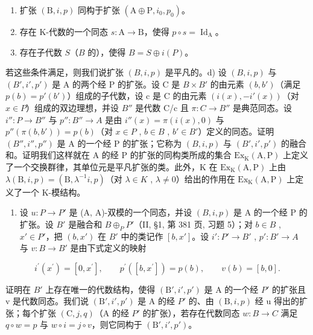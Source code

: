 \begin{enumerate}
\def\labelenumi{(\roman{enumi})}
\item
  扩张 \((\mathrm{B},i,p)\) 同构于扩张 \((\mathrm{A}\oplus \mathrm{P},i_0,p_0)\)。
\item
  存在 K-代数的一个同态 \(s: \mathrm{A} \to \mathrm{B}\)，使得 \(p \circ s = \operatorname{Id}_{\mathrm{A}}\)。
\item
  存在子代数 \(S\)（\(B\) 的），使得 \(B = S \oplus i(P)\)。
\end{enumerate}

若这些条件满足，则我们说扩张 \((B,i,p)\) 是平凡的。d) 设 \((B,i,p)\) 与 \((B',i',p')\) 是 A 的两个经 P 的扩张。设 C 是 \(B \times B'\) 的由元素 \((b,b')\)（满足 \(p(b) = p'(b')\)）组成的子代数，设 c 是 C 的由元素 \((i(x), -i'(x))\)（对 \(x \in P\)）组成的双边理想，并设 \(B''\) 是代数 C/c 且 \(\pi : C \to B''\) 是典范同态。设 \(i'' : P \to B''\) 与 \(p'' : B'' \to A\) 是由 \(i''(x) = \pi(i(x),0)\) 与 \(p''(\pi(b,b')) = p(b)\)（对 \(x \in P\) , \(b \in B\) , \(b' \in B'\)）定义的同态。证明 \((B'', i'', p'')\) 是 A 的一个经 P 的扩张；它称为 \((B,i,p)\) 与 \((B',i',p')\) 的融合和。证明我们这样就在 A 的经 P 的扩张的同构类所成的集合 \(\mathrm{Ex}_{\mathrm{K}}(\mathrm{A},\mathrm{P})\) 上定义了一个交换群律，其单位元是平凡扩张的类。此外，K 在 \(\mathrm{Ex}_{\mathrm{K}}(\mathrm{A},\mathrm{P})\) 上由 \(\lambda(\mathrm{B},i,p) = (\mathrm{B},\lambda^{-1}i,p)\)（对 \(\lambda \in K\) , \(\lambda \neq 0\)）给出的作用在 \(\mathrm{Ex}_{\mathrm{K}}(\mathrm{A},\mathrm{P})\) 上定义了一个 K-模结构。

\begin{enumerate}
\def\labelenumi{\alph{enumi})}
\setcounter{enumi}{4}
\tightlist
\item
  设 \(u: P \to P'\) 是 (A, A)-双模的一个同态，并设 \((B, i, p)\) 是 A 的一个经 P 的扩张。设 \(B'\) 是融合和 \(B \oplus_{P} P'\)（II, §1, 第 381 页, 习题 5）；对 \(b \in B\) , \(x' \in P'\)，把 \((b, x')\) 在 \(B'\) 中的类记作 \([b, x']\)。设 \(i': P' \to B'\) , \(p': B' \to A\) 与 \(v: B \to B'\) 是由下式定义的映射
\end{enumerate}

\[
i ^ {\prime} (x ^ {\prime}) = [ 0, x ^ {\prime} ], \qquad p ^ {\prime} ([ b, x ^ {\prime} ]) = p (b), \qquad v (b) = [ b, 0 ].
\]

证明在 \(B'\) 上存在唯一的代数结构，使得 \((\mathrm{B}', i', p')\) 是 A 的一个经 \(P'\) 的扩张且 v 是代数同态。我们说 \((\mathrm{B}', i', p')\) 是 A 的经 \(P'\) 的、由 \((\mathrm{B}, i, p)\) 经 u 得出的扩张；每个扩张 \((\mathrm{C}, j, q)\)（A 的经 \(P'\) 的扩张），若存在代数同态 \(w: B \to C\) 满足 \(q \circ w = p\) 与 \(w \circ i = j \circ v\)，则它同构于 \((\mathrm{B}', i', p')\)。

